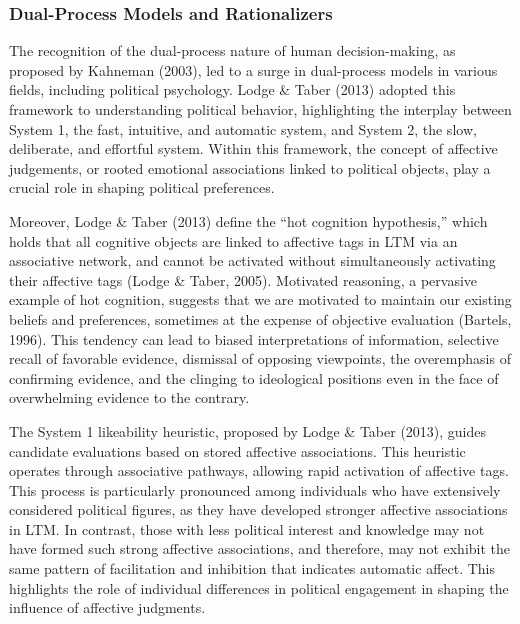 \documentclass[
]{article}
\begin{document}
\hypertarget{dual-process-models-and-rationalizers}{%
\subsubsection{Dual-Process Models and
Rationalizers}\label{dual-process-models-and-rationalizers}}

The recognition of the dual-process nature of human decision-making, as
proposed by Kahneman (2003), led to a surge in dual-process models in
various fields, including political psychology. Lodge \& Taber (2013)
adopted this framework to understanding political behavior, highlighting
the interplay between System 1, the fast, intuitive, and automatic
system, and System 2, the slow, deliberate, and effortful system. Within
this framework, the concept of affective judgements, or rooted emotional
associations linked to political objects, play a crucial role in shaping
political preferences.

Moreover, Lodge \& Taber (2013) define the ``hot cognition hypothesis,''
which holds that all cognitive objects are linked to affective tags in
LTM via an associative network, and cannot be activated without
simultaneously activating their affective tags (Lodge \& Taber, 2005).
Motivated reasoning, a pervasive example of hot cognition, suggests that
we are motivated to maintain our existing beliefs and preferences,
sometimes at the expense of objective evaluation (Bartels, 1996). This
tendency can lead to biased interpretations of information, selective
recall of favorable evidence, dismissal of opposing viewpoints, the
overemphasis of confirming evidence, and the clinging to ideological
positions even in the face of overwhelming evidence to the contrary.

The System 1 likeability heuristic, proposed by Lodge \& Taber (2013),
guides candidate evaluations based on stored affective associations.
This heuristic operates through associative pathways, allowing rapid
activation of affective tags. This process is particularly pronounced
among individuals who have extensively considered political figures, as
they have developed stronger affective associations in LTM. In contrast,
those with less political interest and knowledge may not have formed
such strong affective associations, and therefore, may not exhibit the
same pattern of facilitation and inhibition that indicates automatic
affect. This highlights the role of individual differences in political
engagement in shaping the influence of affective judgments.
\end{document}
